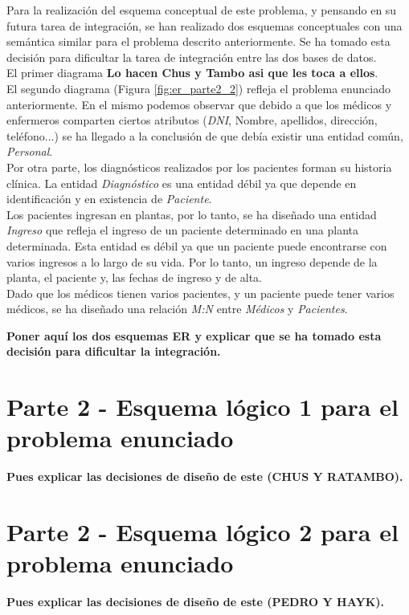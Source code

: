 \documentclass{article}
\begin{document}
Para la realización del esquema conceptual de este problema, y pensando en su futura tarea de integración, se han realizado dos esquemas conceptuales con una semántica similar para el problema descrito anteriormente. Se ha tomado esta decisión para dificultar la tarea de integración entre las dos bases de datos.\\
El primer diagrama \textbf{{\LARGE Lo hacen Chus y Tambo asi que les toca a ellos}}.\\

El segundo diagrama (Figura \ref{fig:er_parte2_2}) refleja el problema enunciado anteriormente. En el mismo podemos observar que debido a que los médicos y enfermeros comparten ciertos atributos (\emph{DNI}, Nombre, apellidos, dirección, teléfono...) se ha llegado a la conclusión de que debía existir una entidad común, \emph{Personal}.\\
Por otra parte, los diagnósticos realizados por los pacientes forman su historia clínica. La entidad \emph{Diagnóstico} es una entidad débil ya que depende en identificación y en existencia de \emph{Paciente}.\\
Los pacientes ingresan en plantas, por lo tanto, se ha diseñado una entidad \emph{Ingreso} que refleja el ingreso de un paciente determinado en una planta determinada. Esta entidad es débil ya que un paciente puede encontrarse con varios ingresos a lo largo de su vida. Por lo tanto, un ingreso depende de la planta, el paciente y, las fechas de ingreso y de alta.\\
Dado que los médicos tienen varios pacientes, y un paciente puede tener varios médicos, se ha diseñado una relación \emph{M:N} entre \emph{Médicos} y \emph{Pacientes}.

\textbf{Poner aquí los dos esquemas ER y explicar que se ha tomado esta decisión para dificultar la integración.}

\section{Parte 2 - Esquema lógico 1 para el problema enunciado}

\textbf{Pues explicar las decisiones de diseño de este (CHUS Y RATAMBO).}

\section{Parte 2 - Esquema lógico 2 para el problema enunciado}

\textbf{Pues explicar las decisiones de diseño de este (PEDRO Y HAYK).}
\end{document}
